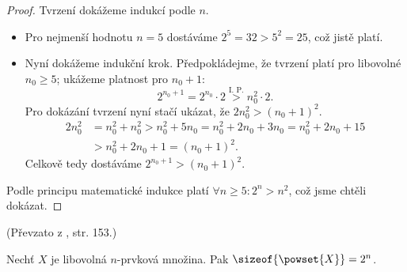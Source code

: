 \begin{proof}
    Tvrzení dokážeme indukcí podle $n$.
    \begin{itemize}
        \item Pro nejmenší hodnotu $n=5$ dostáváme $2^5=32>5^2=25$, což jistě platí.
        \item Nyní dokážeme indukční krok. Předpokládejme, že tvrzení platí pro libovolné $n_0\geq 5$; ukážeme platnost pro $n_0+1$:
        \begin{equation*}
            2^{n_0+1}=2^{n_0}\cdot 2\stackrel{\text{I. P.}}{>} n_0^2 \cdot 2.
        \end{equation*}
        Pro dokázání tvrzení nyní stačí ukázat, že $2n_0^2 > (n_0+1)^2$.
        \begin{align*}
            2n_0^2 &= n_0^2+n_0^2>n_0^2+5n_0=n_0^2+2n_0+3n_0=n_0^2+2n_0+15\\
            &>n_0^2+2n_0+1=(n_0+1)^2.
        \end{align*}
        Celkově tedy dostáváme $2^{n_0+1}>(n_0+1)^2$.
    \end{itemize}
    Podle principu matematické indukce platí $\forall n\geq 5: 2^n>n^2$, což jsme chtěli dokázat.
\end{proof}
(Převzato z \cite{ChartrandPolimeniZhang2014}, str. 153.)
\begin{proposition}
    Nechť $X$ je libovolná $n$-prvková množina. Pak $\sizeof{\powset{X}}=2^n$.
\end{proposition}
